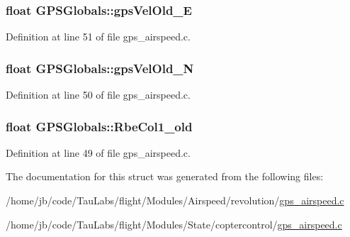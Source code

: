 \hypertarget{struct_g_p_s_globals_af55098326f4e20fe87b1afcf1445d1f0}{
\subsubsection[{gps\-Vel\-Old\-\_\-\-E}]{\setlength{\rightskip}{0pt plus 5cm}float {\bf \-G\-P\-S\-Globals\-::gps\-Vel\-Old\-\_\-\-E}}}\label{struct_g_p_s_globals_af55098326f4e20fe87b1afcf1445d1f0}


\-Definition at line 51 of file gps\-\_\-airspeed.\-c.

\hypertarget{struct_g_p_s_globals_aed518d0e767d4418cae161cd79bcbb14}{
\subsubsection[{gps\-Vel\-Old\-\_\-\-N}]{\setlength{\rightskip}{0pt plus 5cm}float {\bf \-G\-P\-S\-Globals\-::gps\-Vel\-Old\-\_\-\-N}}}\label{struct_g_p_s_globals_aed518d0e767d4418cae161cd79bcbb14}


\-Definition at line 50 of file gps\-\_\-airspeed.\-c.

\hypertarget{struct_g_p_s_globals_a838fd35b2b5e092ed234f1e023a8a171}{
\subsubsection[{\-Rbe\-Col1\-\_\-old}]{\setlength{\rightskip}{0pt plus 5cm}float {\bf \-G\-P\-S\-Globals\-::\-Rbe\-Col1\-\_\-old}}}\label{struct_g_p_s_globals_a838fd35b2b5e092ed234f1e023a8a171}


\-Definition at line 49 of file gps\-\_\-airspeed.\-c.



\-The documentation for this struct was generated from the following files\-:\begin{DoxyCompactItemize}
\item 
/home/jb/code/\-Tau\-Labs/flight/\-Modules/\-Airspeed/revolution/\hyperlink{_airspeed_2revolution_2gps__airspeed_8c}{gps\-\_\-airspeed.\-c}\item 
/home/jb/code/\-Tau\-Labs/flight/\-Modules/\-State/coptercontrol/\hyperlink{_state_2coptercontrol_2gps__airspeed_8c}{gps\-\_\-airspeed.\-c}\end{DoxyCompactItemize}
